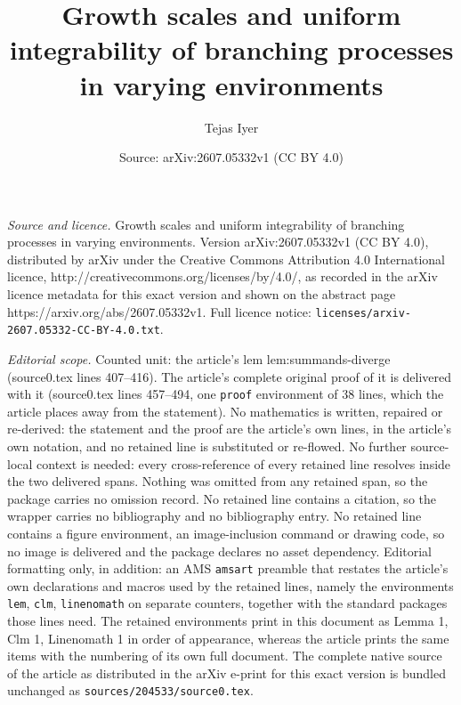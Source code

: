\documentclass[10pt,a4paper]{amsart}
\title{Growth scales and uniform integrability of branching processes in varying environments}
\author{Tejas Iyer}
\date{Source: arXiv:2607.05332v1 (CC BY 4.0)}
\begin{document}
\maketitle

\noindent\emph{Source and licence.} Growth scales and uniform integrability of branching processes in varying environments. Version arXiv:2607.05332v1 (CC BY 4.0), distributed by arXiv under the Creative Commons Attribution 4.0 International licence, http://creativecommons.org/licenses/by/4.0/, as recorded in the arXiv licence metadata for this exact version and shown on the abstract page https://arxiv.org/abs/2607.05332v1. Full licence notice: \texttt{licenses/arxiv-2607.05332-CC-BY-4.0.txt}.\par\smallskip

\noindent\textit{Editorial scope.} Counted unit: the article's lem lem:summands-diverge (source0.tex lines 407--416). The article's complete original proof of it is delivered with it (source0.tex lines 457--494, one \texttt{proof} environment of 38 lines, which the article places away from the statement). No mathematics is written, repaired or re-derived: the statement and the proof are the article's own lines, in the article's own notation, and no retained line is substituted or re-flowed.  No further source-local context is needed: every cross-reference of every retained line resolves inside the two delivered spans.  Nothing was omitted from any retained span, so the package carries no omission record.  No retained line contains a citation, so the wrapper carries no bibliography and no bibliography entry.  No retained line contains a figure environment, an image-inclusion command or drawing code, so no image is delivered and the package declares no asset dependency.  Editorial formatting only, in addition: an AMS \texttt{amsart} preamble that restates the article's own declarations and macros used by the retained lines, namely the environments \texttt{lem}, \texttt{clm}, \texttt{linenomath} on separate counters, together with the standard packages those lines need.  The retained environments print in this document as Lemma 1, Clm 1, Linenomath 1 in order of appearance, whereas the article prints the same items with the numbering of its own full document.  The complete native source of the article as distributed in the arXiv e-print for this exact version is bundled unchanged as \texttt{sources/204533/source0.tex}.
\end{document}
